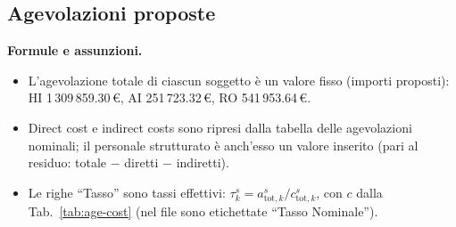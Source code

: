 \documentclass{plan4ari_report}
\begin{document}
\subsection{Agevolazioni proposte}
\textbf{Formule e assunzioni.}
\begin{itemize}
  \item L'agevolazione totale di ciascun soggetto \`e un valore fisso (importi proposti): HI 1\,309\,859.30\,\euro, AI 251\,723.32\,\euro, RO 541\,953.64\,\euro.
  \item Direct cost e indirect costs sono ripresi dalla tabella delle agevolazioni nominali; il personale strutturato \`e anch'esso un valore inserito (pari al residuo: totale $-$ diretti $-$ indiretti).
  \item Le righe ``Tasso'' sono tassi effettivi: $\tau^{s}_k = a^{s}_{\mathrm{tot},k}/c^{s}_{\mathrm{tot},k}$, con $c$ dalla Tab.~\ref{tab:age-cost} (nel file sono etichettate ``Tasso Nominale'').
\end{itemize}
\end{document}
